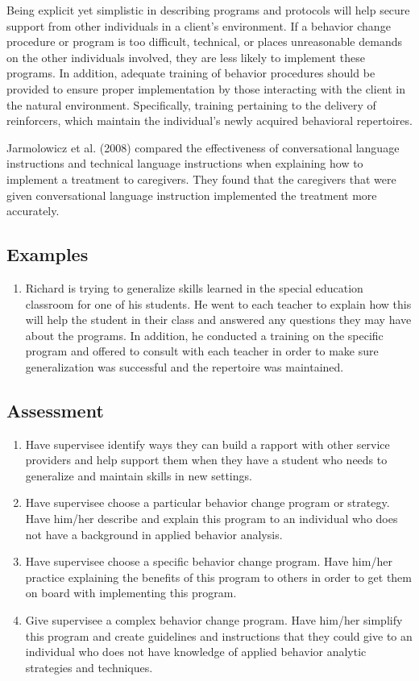 Being explicit yet simplistic in describing programs and protocols will help secure support from other individuals in a client's environment. If a behavior change procedure or program is too difficult, technical, or places unreasonable demands on the other individuals involved, they are less likely to implement these programs. In addition, adequate training of behavior procedures should be provided to ensure proper implementation by those interacting with the client in the natural environment. Specifically, training pertaining to the delivery of reinforcers, which maintain the individual's newly acquired behavioral repertoires.

Jarmolowicz et al. (2008) compared the effectiveness of conversational language instructions and technical language instructions when explaining how to implement a treatment to caregivers. They found that the caregivers that were given conversational language instruction implemented the treatment more accurately.
%
\subsection{Examples}
\begin{enumerate}
\item Richard is trying to generalize skills learned in the special education classroom for one of his students. He went to each teacher to explain how this will help the student in their class and answered any questions they may have about the programs. In addition, he conducted a training on the specific program and offered to consult with each teacher in order to make sure generalization was successful and the repertoire was maintained.
%
\end{enumerate}
%
\subsection{Assessment}
\begin{enumerate}
\item Have supervisee identify ways they can build a rapport with other service providers and help support them when they have a student who needs to generalize and maintain skills in new settings.
\item Have supervisee choose a particular behavior change program or strategy. Have him/her describe and explain this program to an individual who does not have a background in applied behavior analysis. 
\item Have supervisee choose a specific behavior change program. Have him/her practice explaining the benefits of this program to others in order to get them on board with implementing this program.
\item Give supervisee a complex behavior change program. Have him/her simplify this program and create guidelines and instructions that they could give to an individual who does not have knowledge of applied behavior analytic strategies and techniques. 
\end{enumerate}
%
